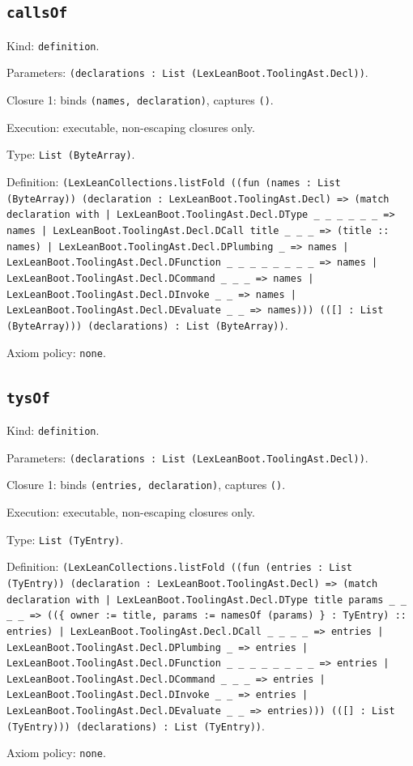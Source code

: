 \documentclass[11pt]{article}
\begin{document}
\subsection*{\texttt{callsOf}}
\noindent Kind: \texttt{definition}.\par
\noindent Parameters: \texttt{(declarations : List (LexLeanBoot.ToolingAst.Decl))}.\par
\noindent Closure 1: binds \texttt{(names, declaration)}, captures \texttt{()}.\par
\noindent Execution: executable, non-escaping closures only.\par
\noindent Type: \texttt{List (ByteArray)}.\par
\noindent Definition: \texttt{(LexLeanCollections.listFold ((fun (names : List (ByteArray)) (declaration : LexLeanBoot.ToolingAst.Decl) => (match declaration with | LexLeanBoot.ToolingAst.Decl.DType \_ \_ \_ \_ \_ \_ => names | LexLeanBoot.ToolingAst.Decl.DCall title \_ \_ \_ => (title :: names) | LexLeanBoot.ToolingAst.Decl.DPlumbing \_ => names | LexLeanBoot.ToolingAst.Decl.DFunction \_ \_ \_ \_ \_ \_ \_ \_ => names | LexLeanBoot.ToolingAst.Decl.DCommand \_ \_ \_ => names | LexLeanBoot.ToolingAst.Decl.DInvoke \_ \_ => names | LexLeanBoot.ToolingAst.Decl.DEvaluate \_ \_ => names))) (([] : List (ByteArray))) (declarations) : List (ByteArray))}.\par
\noindent Axiom policy: \texttt{none}.\par
\subsection*{\texttt{tysOf}}
\noindent Kind: \texttt{definition}.\par
\noindent Parameters: \texttt{(declarations : List (LexLeanBoot.ToolingAst.Decl))}.\par
\noindent Closure 1: binds \texttt{(entries, declaration)}, captures \texttt{()}.\par
\noindent Execution: executable, non-escaping closures only.\par
\noindent Type: \texttt{List (TyEntry)}.\par
\noindent Definition: \texttt{(LexLeanCollections.listFold ((fun (entries : List (TyEntry)) (declaration : LexLeanBoot.ToolingAst.Decl) => (match declaration with | LexLeanBoot.ToolingAst.Decl.DType title params \_ \_ \_ \_ => ((\{ owner := title, params := namesOf (params) \} : TyEntry) :: entries) | LexLeanBoot.ToolingAst.Decl.DCall \_ \_ \_ \_ => entries | LexLeanBoot.ToolingAst.Decl.DPlumbing \_ => entries | LexLeanBoot.ToolingAst.Decl.DFunction \_ \_ \_ \_ \_ \_ \_ \_ => entries | LexLeanBoot.ToolingAst.Decl.DCommand \_ \_ \_ => entries | LexLeanBoot.ToolingAst.Decl.DInvoke \_ \_ => entries | LexLeanBoot.ToolingAst.Decl.DEvaluate \_ \_ => entries))) (([] : List (TyEntry))) (declarations) : List (TyEntry))}.\par
\noindent Axiom policy: \texttt{none}.\par
\end{document}
